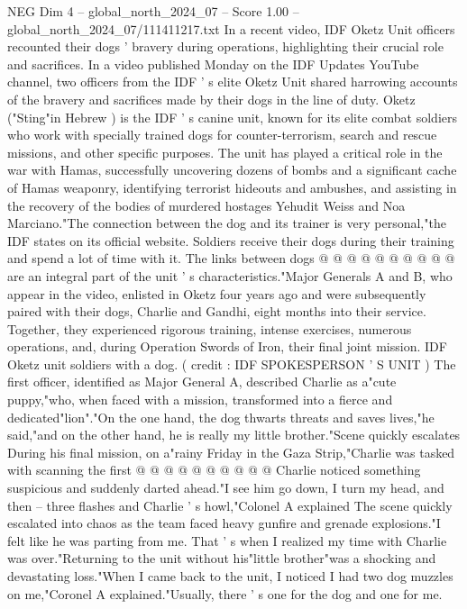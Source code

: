 \begin{textsample}{NEG Dim 4 – global\_north\_2024\_07 – Score 1.00 – global\_north\_2024\_07/111411217.txt}  \label{ex:f4_neg_290}
In a recent video, IDF Oketz Unit officers recounted their dogs ' bravery during operations, highlighting their crucial role and sacrifices.
In a video published Monday on the IDF Updates YouTube channel, two officers from the IDF ' s elite Oketz Unit shared harrowing accounts of the bravery and sacrifices made by their dogs in the line of duty.
Oketz ("Sting"in Hebrew ) is the IDF ' s canine unit, known for its elite combat soldiers who work with specially trained dogs for counter-terrorism, search and rescue missions, and other specific purposes.
The unit has played a critical role in the war with Hamas, successfully uncovering dozens of bombs and a significant cache of Hamas weaponry, identifying terrorist hideouts and ambushes, and assisting in the recovery of the bodies of murdered hostages Yehudit Weiss and Noa Marciano."The connection between the dog and its trainer is very personal,"the IDF states on its official website.
Soldiers receive their dogs during their training and spend a lot of time with it.
The links between dogs @ @ @ @ @ @ @ @ @ @ are an integral part of the unit ' s characteristics."Major Generals A and B, who appear in the video, enlisted in Oketz four years ago and were subsequently paired with their dogs, Charlie and Gandhi, eight months into their service.
Together, they experienced rigorous training, intense exercises, numerous operations, and, during Operation Swords of Iron, their final joint mission.
IDF Oketz unit soldiers with a dog. ( credit : IDF SPOKESPERSON ' S UNIT ) The first officer, identified as Major General A, described Charlie as a"cute puppy,"who, when faced with a mission, transformed into a fierce and dedicated"lion"."On the one hand, the dog thwarts threats and saves lives,"he said,"and on the other hand, he is really my little brother."Scene quickly escalates During his final mission, on a"rainy Friday in the Gaza Strip,"Charlie was tasked with scanning the first @ @ @ @ @ @ @ @ @ @ Charlie noticed something suspicious and suddenly darted ahead."I see him go down, I turn my head, and then -- three flashes and Charlie ' s howl,"Colonel A explained The scene quickly escalated into chaos as the team faced heavy gunfire and grenade explosions."I felt like he was parting from me.
That ' s when I realized my time with Charlie was over."Returning to the unit without his"little brother"was a shocking and devastating loss."When I came back to the unit, I noticed I had two dog muzzles on me,"Coronel A explained."Usually, there ' s one for the dog and one for me.

\end{textsample}
